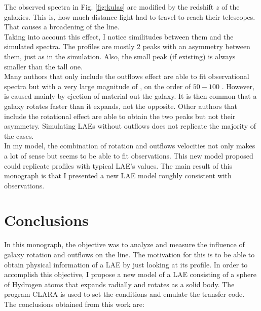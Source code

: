 \documentclass{latex/emulateapj}
\begin{document}
The observed spectra in Fig. \ref{fig:kulas} are modified by the redshift $z$ of the galaxies. This is, how much distance light had to travel to reach their telescopes. That causes a broadening of the line. \\

Taking into account this effect, I notice similitudes between them and the simulated spectra. The \lya profiles are mostly 2 peaks with an asymmetry between them, just as in the simulation. Also, the small peak (if existing) is always smaller than the tall one.\\

Many authors that only include the outflows effect are able to fit observational spectra but with a very large magnitude of \vout, on the order of $50-100$ \kms. However, \vout is caused mainly by ejection of material out the galaxy. It is then common that a galaxy rotates faster than it expands, not the opposite. Other authors that include the rotational effect are able to obtain the two peaks but not their asymmetry. Simulating LAEs without outflows does not replicate the majority of the cases. \\

In my model, the combination of rotation and outflows velocities not only makes a lot of sense but seems to be able to fit observations. This new model proposed could replicate \lya profiles with typical LAE's values. The main result of this monograph is that I presented a new LAE model roughly consistent with observations.\\


\section{Conclusions}
\label{sec:conclusions}

In this monograph, the objective was to analyze and measure the influence of galaxy rotation and outflows on the \lya line. The motivation for this is to be able to obtain physical information of a LAE by just looking at its \lya profile. In order to accomplish this objective, I propose a new model of a LAE consisting of a sphere of Hydrogen atoms that expands radially and rotates as a solid body. The program CLARA \cite{CLARA} is used to set the conditions and emulate the transfer code. \\

The conclusions obtained from this work are: \\
\end{document}
